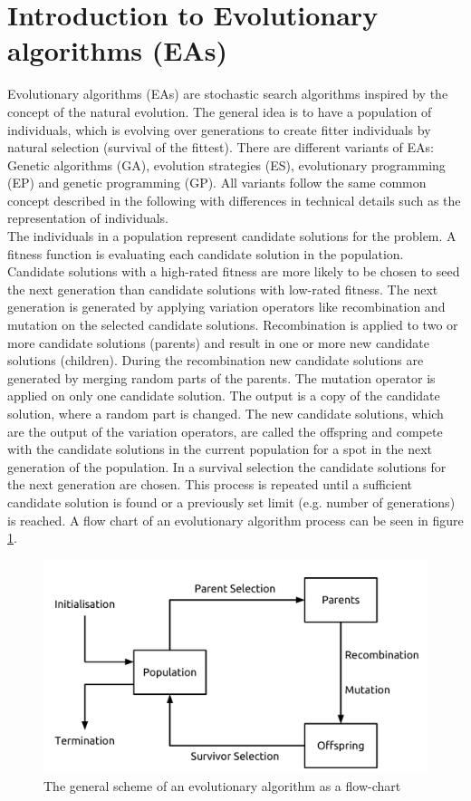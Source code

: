 \newpage
\section{Introduction to Evolutionary algorithms (EAs)}
Evolutionary algorithms (EAs) are stochastic search algorithms inspired by the concept of the natural evolution. The general idea is to have a population of individuals, which is evolving over generations to create fitter individuals by natural selection (survival of the fittest). There are different variants of EAs: Genetic algorithms (GA), evolution strategies (ES), evolutionary programming (EP) and genetic programming (GP). All variants follow the same common concept described in the following with differences in technical details such as the representation of individuals\cite{Eiben}.\\
The individuals in a population represent candidate solutions for the problem. A fitness function is evaluating each candidate solution in the population. Candidate solutions with a high-rated fitness are more likely to be chosen to seed the next generation than candidate solutions with low-rated fitness. The next generation is generated by applying variation operators like recombination and mutation on the selected candidate solutions. Recombination is applied to two or more candidate solutions (parents) and result in one or more new candidate solutions (children). During the recombination new candidate solutions are generated by merging random parts of the parents. The mutation operator is applied on only one candidate solution. The output is a copy of the candidate solution, where a random part is changed. The new candidate solutions, which are the output of the variation operators, are called the offspring and compete with the candidate solutions in the current population for a spot in the next generation of the population. In a survival selection the candidate solutions for the next generation are chosen. This process is repeated until a sufficient candidate solution is found or a previously set limit (e.g. number of generations) is reached. A flow chart of an evolutionary algorithm process can be seen in figure \ref{fig:eaflowchart}.\\
\begin{figure}
    \centering
    \includegraphics[scale=0.4]{./Figures/EAFlowchart}
    \caption{The general scheme of an evolutionary algorithm as a flow-chart \cite{Eiben}}
    \label{fig:eaflowchart}
\end{figure}
